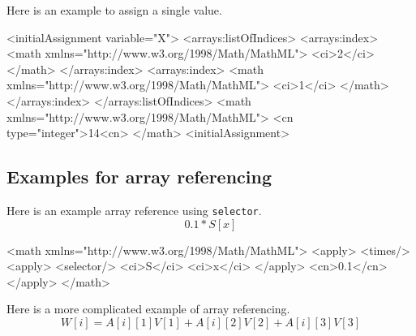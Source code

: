 

Here is an example to assign a single value. 

\begin{example}
<initialAssignment variable="X"> 
 <arrays:listOfIndices>
  <arrays:index>
    <math xmlns="http://www.w3.org/1998/Math/MathML">
      <ci>2</ci>
    </math>
  </arrays:index>
  <arrays:index>
    <math xmlns="http://www.w3.org/1998/Math/MathML">
      <ci>1</ci>
    </math>
  </arrays:index>
 </arrays:listOfIndices>
 <math xmlns="http://www.w3.org/1998/Math/MathML">
  <cn type="integer">14<cn>
 </math>
<initialAssignment>
\end{example}

\subsection{Examples for array referencing}

Here is an example array reference using {\tt selector}.
\begin{displaymath}
0.1 * S[x]
\end{displaymath}
\begin{example}
<math xmlns="http://www.w3.org/1998/Math/MathML">
 <apply>
  <times/>
   <apply>
    <selector/>
     <ci>S</ci>
     <ci>x</ci> 
   </apply>
   <cn>0.1</cn>
 </apply>
</math>
\end{example}

Here is a more complicated example of array referencing.
\begin{displaymath}
W[i]= A[i][1]V[1]+ A[i][2]V[2]+ A[i][3]V[3]
\end{displaymath}

